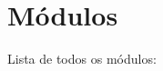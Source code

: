\section{Módulos}
Lista de todos os módulos\+:\begin{DoxyCompactList}
\item {}
\end{DoxyCompactList}
